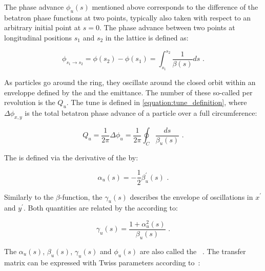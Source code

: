 The phase advance \(\phi_u(s)\) mentioned above corresponds to the difference of the betatron phase functions at two points, typically also taken with respect to an arbitrary initial point at \(s = 0\).
The phase advance between two points at longitudinal positions \(s_1\) and \(s_2\) in the lattice is defined as:

\begin{equation}
    \phi_{s_1 \rightarrow s_2} = \phi(s_{2}) - \phi(s_{1}) = \int_{s_{1}}^{s_{2}} \frac{1}{\beta(s)} ds \text{ .}
    \label{equation:phase_advance_definition}
\end{equation}

As particles go around the ring, they oscillate around the closed orbit within an enveloppe defined by the \betafunctions and the emittance.
The number of these so-called  per revolution is the  \(Q_u\).
The tune is defined in \cref{equation:tune_definition}, where \(\Delta \phi_{x, y}\) is the total betatron phase advance of a particle over a full circumference:

\begin{equation}
    Q_{u} = \frac{1}{2 \pi} \Delta \phi_{u} = \frac{1}{2 \pi} \oint_C \dfrac{ds}{\beta_{u} (s)} \text{ .}
    \label{equation:tune_definition}
\end{equation}

The \alphafunction is defined via the derivative of the \betafunction by:

\begin{equation}
    \alpha_u(s) = - \frac{1}{2} \beta^{\prime}_u(s) \text{ .}
    \label{equation:alpha_function}
\end{equation}

Similarly to the \(\beta\)-function, the  \(\gamma_u(s)\) describes the envelope of oscillations in \(x^{\prime}\) and \(y^{\prime}\).
Both quantities are related by the \alphafunction according to:

\begin{equation}
    \gamma_u(s) = \frac{1 + \alpha_u^2(s)}{\beta_u(s)} \text{ .}
    \label{equation:gamma_function}
\end{equation}

The \(\alpha_u (s)\), \(\beta_u (s)\), \(\gamma_u (s)\) and \(\phi_u (s)\) are also called the ~\cite{RSI:Twiss:Orbital_Stability_Proton_Synchrotron}.
The transfer matrix can be expressed with Twiss parameters according to~\cite{AOP:COURANT:Theory_Alternating_Gradient_Synchrotron}:

